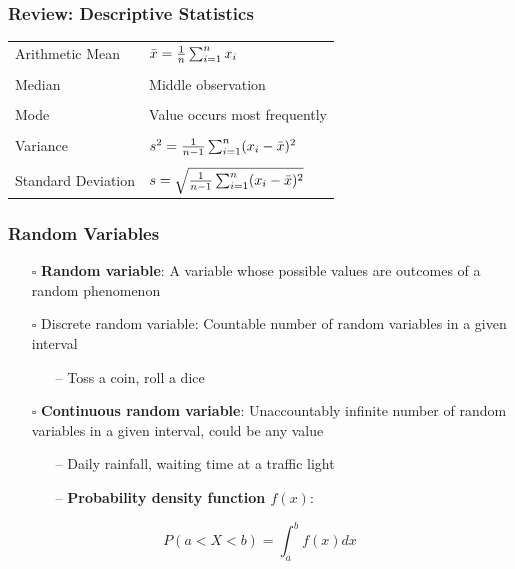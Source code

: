 \documentclass[handout]{beamer}
\begin{document}
\begin{frame}
    \frametitle{Review: Descriptive Statistics}
    \begin{table}[h]
        \centering
        \begin{tabular}{l l}
        \toprule
         Arithmetic Mean & $\Bar{x} = \frac{1}{n}\sum^{n}_{i=1}x_i$ \\
         & \\
         Median & Middle observation \\
         & \\
         Mode & Value occurs most frequently\\
         & \\
         Variance & $s^2 =  \frac{1}{n-1}\sum^{n}_{i=1}(x_i-\Bar{x})^2 $\\
         & \\
         Standard Deviation & $s =\sqrt{\frac{1}{n-1}\sum^{n}_{i=1}(x_i-\Bar{x})^2} $\\
        \bottomrule    
        \end{tabular}
        \label{tab:my_label}
    \end{table}
    \vspace*{\fill}
\end{frame}

\begin{frame}
    \frametitle{Random Variables}
    \begin{itemize}[wide = 0pt]
        \item[$\square$] \textbf{Random variable}: A variable whose possible values are outcomes of a random phenomenon
        \item[$\square$] Discrete random variable: Countable number of random variables in a given interval
        \begin{itemize}
            \item[--] Toss a coin, roll a dice
        \end{itemize}
        \item[$\square$] \textbf{Continuous random variable}: Unaccountably infinite number of random variables in a given interval, could be any value
        \begin{itemize}
            \item[--] Daily rainfall, waiting time at a traffic light
            \item[--] \textbf{{\color{red}Probability density function $f(x)$}}:
        \end{itemize}
    \end{itemize}
    \begin{equation*}
        P(a<X<b)=\int_a^bf(x)dx
    \end{equation*}
    \vspace*{\fill}
\end{frame}
\end{document}
